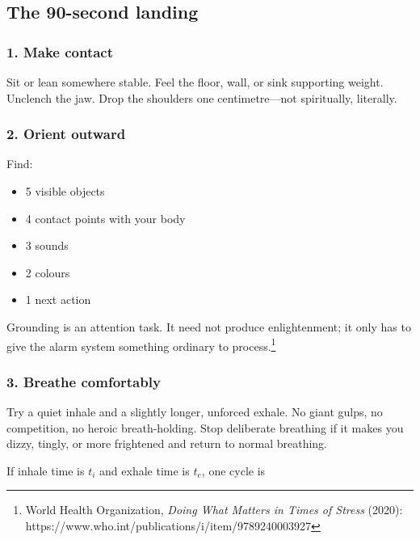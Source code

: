 \hypertarget{the-90-second-landing}{%
\subsection{The 90-second landing}\label{the-90-second-landing}}

\hypertarget{make-contact}{%
\subsubsection{1. Make contact}\label{make-contact}}

Sit or lean somewhere stable. Feel the floor, wall, or sink supporting
weight. Unclench the jaw. Drop the shoulders one centimetre---not
spiritually, literally.

\hypertarget{orient-outward}{%
\subsubsection{2. Orient outward}\label{orient-outward}}

Find:

\begin{itemize}
\tightlist
\item
  5 visible objects
\item
  4 contact points with your body
\item
  3 sounds
\item
  2 colours
\item
  1 next action
\end{itemize}

Grounding is an attention task. It need not produce enlightenment; it
only has to give the alarm system something ordinary to
process.\footnote{World Health Organization, \emph{Doing What Matters in
  Times of Stress} (2020):
  https://www.who.int/publications/i/item/9789240003927}

\hypertarget{breathe-comfortably}{%
\subsubsection{3. Breathe comfortably}\label{breathe-comfortably}}

Try a quiet inhale and a slightly longer, unforced exhale. No giant
gulps, no competition, no heroic breath-holding. Stop deliberate
breathing if it makes you dizzy, tingly, or more frightened and return
to normal breathing.

If inhale time is \(t_i\) and exhale time is \(t_e\), one cycle is

